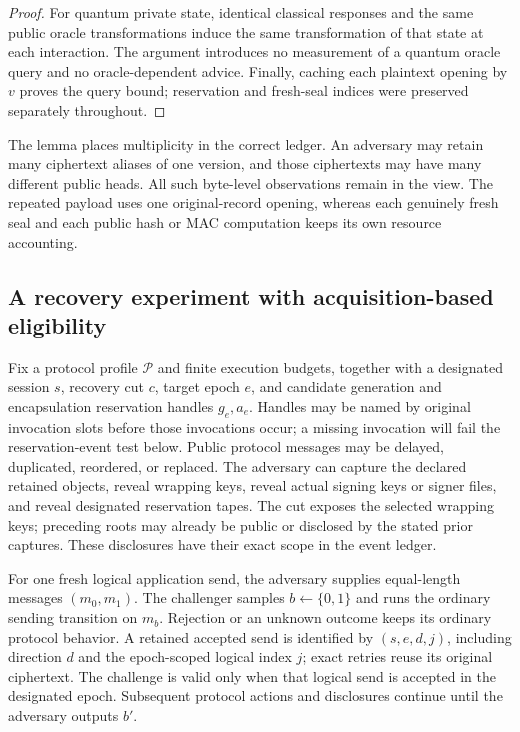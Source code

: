 \begin{proof}
For quantum private state, identical classical responses and the same public
oracle transformations induce the same transformation of that state at
each interaction.  The argument introduces no measurement of a quantum
oracle query and no oracle-dependent advice.  Finally, caching each
plaintext opening by $v$ proves the query bound; reservation and fresh-seal
indices were preserved separately throughout.
\end{proof}

The lemma places multiplicity in the correct ledger.  An adversary may retain
many ciphertext aliases of one version, and those ciphertexts may have many
different public heads.  All such byte-level observations remain in the view.
The repeated payload uses one original-record opening, whereas each genuinely
fresh seal and each public hash or MAC computation keeps its own resource
accounting.




\subsection{A recovery experiment with acquisition-based eligibility}

\begin{definition}
\label{def:recovery-game}
Fix a protocol profile $\mathcal P$ and finite execution budgets, together with
a designated session $s$, recovery cut $c$, target epoch $e$, and candidate
generation and encapsulation reservation handles $g_e,a_e$.  Handles may be
named by original invocation slots before those invocations occur; a missing
invocation will fail the reservation-event test below.  Public
protocol messages may be delayed, duplicated, reordered, or replaced.
The adversary can capture the declared retained objects, reveal wrapping
keys, reveal actual signing keys or signer files, and reveal designated
reservation tapes.  The cut exposes the selected wrapping keys; preceding
roots may already be public or disclosed by the stated prior captures.
These disclosures have their exact scope in the event ledger.

For one fresh logical application send, the adversary supplies equal-length
messages $(m_0,m_1)$.  The challenger samples $b\leftarrow\{0,1\}$ and runs
the ordinary sending transition on $m_b$.  Rejection or an unknown outcome
keeps its ordinary protocol behavior.  A retained accepted send is identified
by $(s,e,d,j)$, including direction $d$ and the epoch-scoped logical index $j$;
exact retries reuse its original ciphertext.  The challenge is valid only
when that logical send is accepted in the designated epoch.  Subsequent
protocol actions and disclosures continue until the adversary outputs $b'$.
\end{definition}


